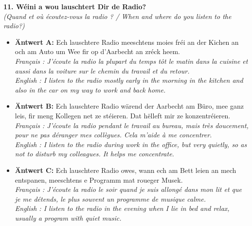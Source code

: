 \noindent\textbf{11. Wéini a wou lauschtert Dir de Radio?}\\
\textit{(Quand et où écoutez-vous la radio ? / When and where do you listen to the radio?)}
\begin{itemize}
    \item \textbf{Äntwert A:} Ech lauschtere Radio meeschtens moies fréi an der Kichen an och am Auto um Wee fir op d'Aarbecht an zréck heem.\\
    \textit{Français : J'écoute la radio la plupart du temps tôt le matin dans la cuisine et aussi dans la voiture sur le chemin du travail et du retour.}\\
    \textit{English : I listen to the radio mostly early in the morning in the kitchen and also in the car on my way to work and back home.}
    \item \textbf{Äntwert B:} Ech lauschtere Radio wärend der Aarbecht am Büro, mee ganz leis, fir meng Kollegen net ze stéieren. Dat hëlleft mir ze konzentréieren.\\
    \textit{Français : J'écoute la radio pendant le travail au bureau, mais très doucement, pour ne pas déranger mes collègues. Cela m'aide à me concentrer.}\\
    \textit{English : I listen to the radio during work in the office, but very quietly, so as not to disturb my colleagues. It helps me concentrate.}
    \item \textbf{Äntwert C:} Ech lauschtere Radio owes, wann ech am Bett leien an mech entspanen, meeschtens e Programm mat roueger Musek.\\
    \textit{Français : J'écoute la radio le soir quand je suis allongé dans mon lit et que je me détends, le plus souvent un programme de musique calme.}\\
    \textit{English : I listen to the radio in the evening when I lie in bed and relax, usually a program with quiet music.}
\end{itemize}
\vspace{0.5em}

